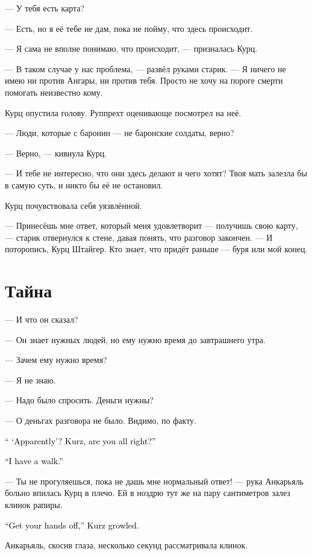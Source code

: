 \documentclass[a4paper,10pt,fleqn]{book}\usepackage{polyglossia}\setdefaultlanguage{english}\setotherlanguage{russian}\defaultfontfeatures{Ligatures=TeX,Mapping=tex-text}\usepackage{xcolor}\definecolor{lightgray}{HTML}{bbbbbb}\color{lightgray}\newcommand{\ml}[3]{\textcolor{black}{#3}}
\begin{document}
--- У тебя есть карта?

--- Есть, но я её тебе не дам, пока не пойму, что здесь происходит.

--- Я сама не вполне понимаю, что происходит, --- призналась Курц.

--- В таком случае у нас проблема, --- развёл руками старик.
--- Я ничего не имею ни против Ангары, ни против тебя.
Просто не хочу на пороге смерти помогать неизвестно кому.

Курц опустила голову.
Руппрехт оценивающе посмотрел на неё.

--- Люди, которые с баронин --- не баронские солдаты, верно?

--- Верно, --- кивнула Курц.

--- И тебе не интересно, что они здесь делают и чего хотят?
Твоя мать залезла бы в самую суть, и никто бы её не остановил.

Курц почувствовала себя уязвлённой.

--- Принесёшь мне ответ, который меня удовлетворит --- получишь свою карту, --- старик отвернулся к стене, давая понять, что разговор закончен.
--- И поторопись, Курц Штайгер.
Кто знает, что придёт раньше --- буря или мой конец.

\section{Тайна}

--- И что он сказал?

--- Он знает нужных людей, но ему нужно время до завтрашнего утра.

--- Зачем ему нужно время?

--- Я не знаю.

--- Надо было спросить.
Деньги нужны?

--- О деньгах разговора не было.
Видимо, по факту.

\ml{$0$}
{--- <<Видимо>>?}
{`` `Apparently'?}
\ml{$0$}
{Курц, с тобой всё в порядке?}
{Kurz, are you all right?''}

\ml{$0$}
{--- Я прогуляюсь.}
{``I have a walk.''}

--- Ты не прогуляешься, пока не дашь мне нормальный ответ! --- рука Анкарьяль больно впилась Курц в плечо.
Ей в ноздрю тут же на пару сантиметров залез клинок рапиры.

\ml{$0$}
{--- Убери руки, --- прорычала Курц.}
{``Get your hands off,'' Kurz growled.}

Анкарьяль, скосив глаза, несколько секунд рассматривала клинок.
\end{document}
